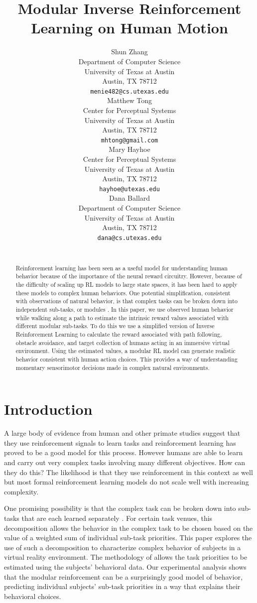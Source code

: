 \documentclass[11pt]{article} %
\title{Modular Inverse Reinforcement Learning on Human Motion}
\author{
Shun Zhang\\
Department of Computer Science\\
University of Texas at Austin\\
Austin, TX 78712 \\
\texttt{menie482@cs.utexas.edu} \\
\And
Matthew Tong \\
Center for Perceptual Systems\\
University of Texas at Austin\\
Austin, TX 78712 \\
\texttt{mhtong@gmail.com} \\
\AND
Mary Hayhoe \\
Center for Perceptual Systems\\
University of Texas at Austin\\
Austin, TX 78712 \\
\texttt{hayhoe@utexas.edu} \\
\And
Dana Ballard \\
Department of Computer Science\\
University of Texas at Austin\\
Austin, TX 78712 \\
\texttt{dana@cs.utexas.edu} \\
\\
}
\begin{document}
\maketitle

\begin{abstract}
Reinforcement learning has been seen as a useful model for understanding human
behavior because of the importance of the neural reward circuitry. However,
because of the difficulty of scaling up RL models to large state spaces, it has
been hard to apply these models to complex human behaviors. One potential
simplification, consistent with observations of natural behavior, is that
complex tasks can be broken down into independent sub-tasks, or modules . In
this paper, we use observed human behavior while walking along a path to
estimate the intrinsic reward values associated with different modular
sub-tasks. To do this we use a simplified version of Inverse Reinforcement
Learning to calculate the reward associated with path following, obstacle
avoidance, and target collection of humans acting in an immersive virtual
environment. Using the estimated values, a modular RL model can generate
realistic behavior consistent with human action choices. This provides a way of
understanding momentary sensorimotor decisions made in complex natural
environments.
\end{abstract}


\startmain %

\section{Introduction}

A large body of evidence from human and other primate studies 
suggest that they use reinforcement signals to learn tasks and reinforcement 
learning has proved to be a good model for this process.
However humans are able to learn and carry out very complex tasks involving 
many different objectives. 
How can they do this? The likelihood is that they use reinforcement in this 
context as well but most formal reinforcement learning models do not scale 
well with increasing complexity.

One promising possibility is that the complex task can be broken down into 
sub-tasks that are each learned separately \cite{sprague2003multiple,
rothkopf2013modular, dietterich2000hierarchical}. 
For certain task venues, this decomposition allows the behavior in the complex 
task to be chosen based on the value of a weighted sum of individual sub-task priorities.
This paper explores the use of such a decomposition to characterize complex
behavior of subjects in a virtual reality environment. The methodology of
\cite{rothkopf2013modular} allows the task priorities to be estimated using the
subjects' behavioral data. Our experimental analysis shows that the modular reinforcement can be a 
surprisingly good model of behavior, predicting individual subjects' sub-task 
priorities in a way that explains their behavioral choices.
\end{document}
